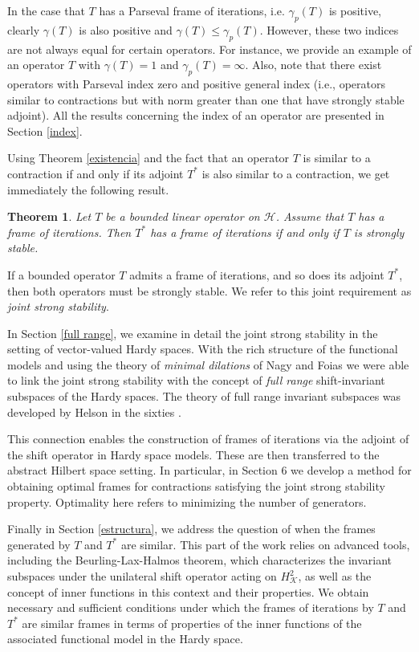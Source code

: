 \documentclass[a4paper,12pt]{amsart}
\def\HH{{\mathcal{H}}}
\def\KK{{\mathcal{K}}}
\newtheorem{theorem}{Theorem}[section]
\theoremstyle{definition}
\begin{document}
In the case that $T$ has a Parseval frame of iterations, i.e. $\gamma_p(T)$ is positive, clearly $\gamma(T)$ is also positive and $\gamma(T)\leqslant\gamma_p(T)$.
However, these two indices are not always equal for certain operators. For instance, we provide an example of an operator $T$ with $\gamma(T)=1$ and $\gamma_p(T)=\infty$. Also, note that there exist operators with Parseval index zero and positive general index (i.e., operators similar to contractions but with norm greater than one that have strongly stable adjoint). All the results concerning the index of an operator are presented  in Section \ref{index}.


Using Theorem \ref{existencia} and the fact that an operator $T$ is similar to a contraction if and only if its adjoint $T^*$ is also similar to a contraction, we get immediately the following result.

\begin{theorem}\label{coro}
Let $T$ be a bounded linear operator on $\HH$. Assume that $T$ has a frame of iterations. Then $T^*$ has a frame of iterations if and only if $T$ is strongly stable.
\end{theorem}

If a bounded operator $T$
admits a frame of iterations, and so does its adjoint $T^*$, then both operators must be strongly stable. We refer to this joint requirement as {\em joint strong stability}.
 
In Section \ref{full range}, we examine in detail the joint strong stability in the setting of vector-valued Hardy spaces. With the rich structure of the functional models and using the theory of {\em minimal dilations} of Nagy and Foias \cite{NFBK10} we were able to link the joint strong stability with the concept of {\em full range} shift-invariant subspaces of the Hardy spaces. The theory of full range invariant subspaces was developed by Helson in the sixties \cite{H}.
 
This connection enables the construction of frames of iterations via the adjoint of the shift operator in Hardy space models. These are then transferred to the abstract Hilbert space setting. In particular, in Section 6 we develop a method for obtaining optimal frames for contractions satisfying the joint strong stability property. Optimality here refers to minimizing the number of generators.


Finally in Section \ref{estructura}, we address the question of when the frames generated by $T$ and $T^*$ are similar. This part of the work relies on advanced tools, including the Beurling-Lax-Halmos theorem, which characterizes the invariant subspaces under the unilateral shift operator acting on $H^2_\KK$, as well as the concept of inner functions in this context and their properties. We obtain necessary and sufficient conditions under which the frames of iterations by $T$ and $T^*$ are similar frames in terms of properties of the inner functions of the associated functional model in the Hardy space.
\end{document}
